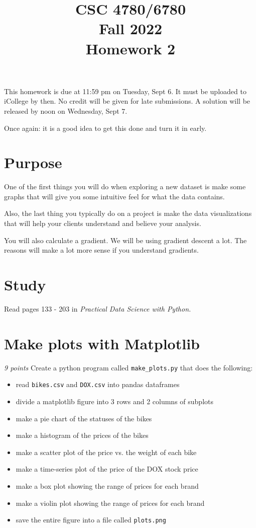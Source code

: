 \documentclass[11pt,english]{article}
\begin{document}
\title{CSC 4780/6780 \\
Fall 2022\\ Homework 2}
\maketitle

This homework is due at 11:59 pm on Tuesday,  Sept 6.   It must be uploaded to iCollege by then.  No credit will be given for late submissions.  A solution will be released by noon on Wednesday,  Sept 7.

Once again: it is a good idea to get this done and turn it in early.

\section{Purpose}

One of the first things you will do when exploring a new dataset is make some graphs that will give you some intuitive feel for what the data contains.

Also,  the last thing you typically do on a project is make the data visualizations that will help your clients understand and believe your analysis.

You will also calculate a gradient.  We will be using gradient descent a lot.  The reasons will make a lot more sense if you understand gradients.

\section{Study}

Read pages 133 - 203 in \textit{Practical Data Science with Python.}

\section{Make plots with Matplotlib}

\textit{9 points} Create a python program called \texttt{make\_plots.py} that does the following:

\begin{itemize}
\item read \texttt{bikes.csv} and \texttt{DOX.csv} into pandas dataframes
\item divide a matplotlib figure into 3 rows and 2 columns of subplots
\item make a pie chart of the statuses of the bikes
\item make a histogram of the prices of the bikes
\item make a scatter plot of the price vs. the weight of each bike
\item make a time-series plot of the price of the DOX stock price
\item make a box plot showing the range of prices for each brand
\item make a violin plot showing the range of prices for each brand
\item save the entire figure into a file called \texttt{plots.png}
\end{itemize}
\end{document}

